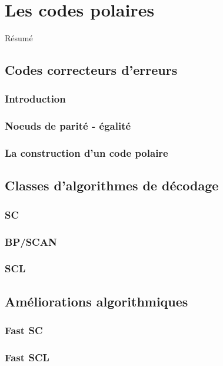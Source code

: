 
\chapter{Les codes polaires}

Résumé

\vspace*{\fill}
\minitocTITI
\vspace*{\fill}

\section{Codes correcteurs d'erreurs}

\subsection{Introduction}
\subsection{Noeuds de parité - égalité}
\subsection{La construction d'un code polaire}

\section{Classes d'algorithmes de décodage}

\subsection{SC}
\subsection{BP/SCAN}
\subsection{SCL}

\section{Améliorations algorithmiques}

\subsection{Fast SC}
\subsection{Fast SCL}
